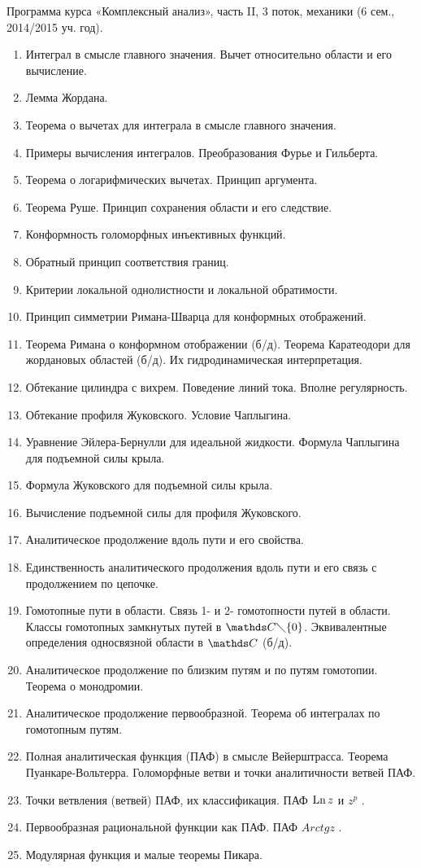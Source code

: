 
  Программа курса «Комплексный анализ», часть II,
  3 поток, механики (6 сем., 2014/2015 уч. год).
\begin{enumerate}
\item   Интеграл в смысле главного значения. Вычет относительно области и его   
      вычисление. 
\item Лемма Жордана.
\item   Теорема о вычетах для интеграла в смысле главного значения. 
\item   Примеры вычисления интегралов. Преобразования Фурье и Гильберта. 
\item  Теорема о логарифмических вычетах. Принцип аргумента. 
\item  Теорема Руше. Принцип сохранения области и его следствие.
\item  Конформность голоморфных инъективных функций.
\item  Обратный принцип соответствия границ.
\item   Критерии локальной однолистности и локальной обратимости.
\item Принцип симметрии Римана-Шварца для конформных отображений.
\item Теорема Римана о конформном отображении (б/д). Теорема Каратеодори 
      для жордановых областей (б/д). Их гидродинамическая интерпретация.
\item Обтекание цилиндра с вихрем. Поведение линий тока. Вполне 
      регулярность.
\item Обтекание профиля Жуковского. Условие Чаплыгина.
\item Уравнение Эйлера-Бернулли для идеальной жидкости. Формула 
      Чаплыгина для подъемной силы крыла.
\item Формула Жуковского для подъемной силы крыла.
\item Вычисление подъемной силы для профиля Жуковского.
\item Аналитическое продолжение вдоль пути и его свойства. 
\item Единственность аналитического продолжения вдоль пути и его связь с 
      продолжением по цепочке.
\item Гомотопные пути в области.  Связь 1- и 2- гомотопности путей в области. 
      Классы гомотопных замкнутых путей в  $\C \diagdown \{0\}$. Эквивалентные 
      определения односвязной области в  $\C$ (б/д).
\item Аналитическое продолжение по близким путям и по путям гомотопии. 
      Теорема о монодромии.
\item Аналитическое продолжение первообразной. Теорема об интегралах  по 
      гомотопным путям.
\item Полная аналитическая функция  (ПАФ)  в смысле Вейерштрасса. 
      Теорема Пуанкаре-Вольтерра. Голоморфные ветви и точки аналитичности  
      ветвей ПАФ. 
\item Точки ветвления (ветвей) ПАФ, их классификация. ПАФ $\operatorname{Ln} z$ и $z^p$  . 
\item Первообразная рациональной функции как ПАФ. ПАФ $Arctg z$ . 
\item Модулярная функция и малые теоремы Пикара. 

\end{enumerate}